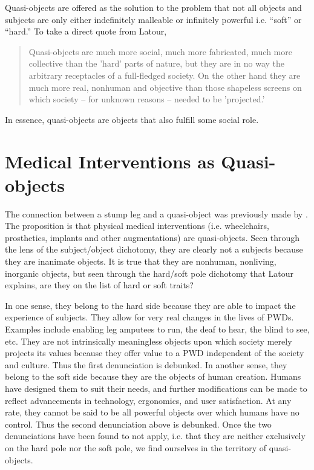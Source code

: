 \documentclass[a4paper]{article}
\begin{document}
\begin{appendices}
Quasi-objects are offered as the solution to the problem that not all objects
and subjects are only either indefinitely malleable or infinitely powerful
i.e. ``soft'' or ``hard.'' To take a direct quote from Latour,
%
\begin{quote}
Quasi-objects are much more social, much more fabricated, much more
collective than the 'hard' parts of nature, but they are in no way the
arbitrary receptacles of a full-fledged society. On the other hand they are
much more real, nonhuman and objective than those shapeless screens on which
society – for unknown reasons – needed to be 'projected.' \citep{latour2012we}
\end{quote}
%
In essence, quasi-objects are objects that also fulfill some social role.


\newpage
\section{Medical Interventions as Quasi-objects}
\label{pros-quasi}

The connection between a stump leg and a quasi-object was previously made by
\cite{bertram2018bestial}. The proposition is that physical medical
interventions (i.e. wheelchairs, prosthetics, implants and other
augmentations) are quasi-objects. Seen through the lens of the subject/object
dichotomy, they are clearly not a subjects because they are inanimate objects.
It is true that they are nonhuman, nonliving, inorganic objects, but seen
through the hard/soft pole dichotomy that Latour explains, are they on the
list of hard or soft traits?

In one sense, they belong to the hard side because they are able to impact the
experience of subjects. They allow for very real changes in the lives of PWDs.
Examples include enabling leg amputees to run, the deaf to hear, the blind to
see, etc. They are not intrinsically meaningless objects upon which society
merely projects its values because they offer value to a PWD independent of
the society and culture. Thus the first denunciation is debunked. In another
sense, they belong to the soft side because they are the objects of human
creation. Humans have designed them to suit their needs, and further
modifications can be made to reflect advancements in technology, ergonomics,
and user satisfaction. At any rate, they cannot be said to be all powerful
objects over which humans have no control. Thus the second denunciation above
is debunked. Once the two denunciations have been found to not apply, i.e.
that they are neither exclusively on the hard pole nor the soft pole, we find
ourselves in the territory of quasi-objects.

\end{appendices}
\end{document}
